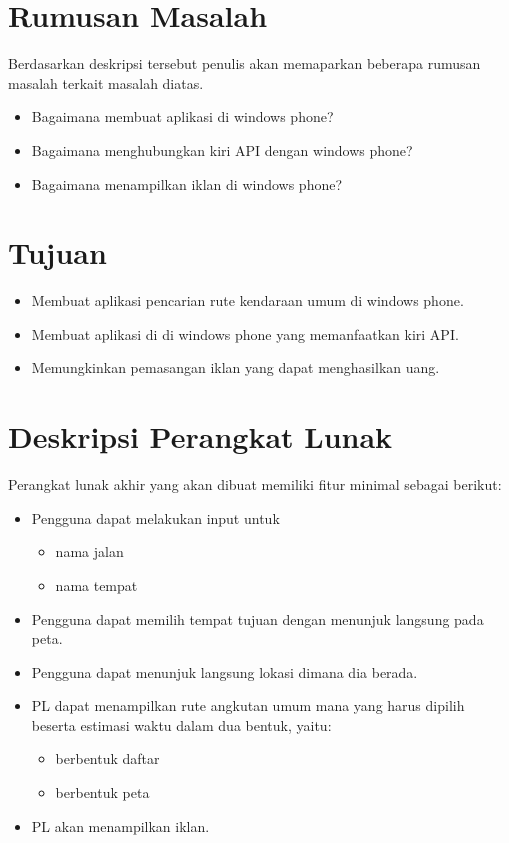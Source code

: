\documentclass[a4paper,twoside]{article}
\begin{document}
\section{Rumusan Masalah}
Berdasarkan deskripsi tersebut penulis akan memaparkan beberapa rumusan masalah terkait masalah diatas.
\begin{itemize}
	\item Bagaimana membuat aplikasi di windows phone?
	\item Bagaimana menghubungkan kiri API dengan windows phone?
	\item Bagaimana menampilkan iklan di windows phone?
\end{itemize}

\section{Tujuan}
\begin{itemize}
	\item Membuat aplikasi pencarian rute kendaraan umum di windows phone.
	\item Membuat aplikasi di di windows phone yang memanfaatkan kiri API.
	\item Memungkinkan pemasangan iklan yang dapat menghasilkan uang.
\end{itemize}

\section{Deskripsi Perangkat Lunak}
Perangkat lunak akhir yang akan dibuat memiliki fitur minimal sebagai berikut:
\begin{itemize}
	\item Pengguna dapat melakukan input untuk
	\begin{itemize}
		\item nama jalan
		\item nama tempat
	\end{itemize}
	\item Pengguna dapat memilih tempat tujuan dengan menunjuk langsung pada peta.
	\item Pengguna dapat menunjuk langsung lokasi dimana dia berada.
	\item PL dapat menampilkan rute angkutan umum mana yang harus dipilih beserta estimasi waktu dalam dua bentuk, yaitu:
	\begin{itemize}
		\item berbentuk daftar
		\item berbentuk peta
	\end{itemize}
	\item PL akan menampilkan iklan.
\end{itemize}
\end{document}
